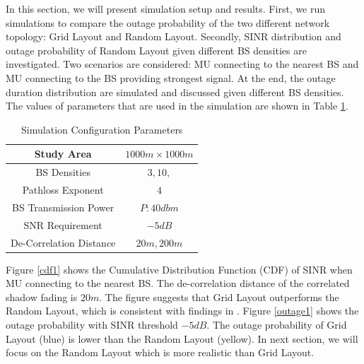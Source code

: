 \documentclass[journal,comsoc]{IEEEtran}
\begin{document}
In this section, we will present simulation setup and results. First, we run simulations to compare the outage probability of the two different network topology: Grid Layout and Random Layout. Secondly, SINR distribution and outage probability of Random Layout given different BS densities are investigated. Two scenarios are considered: MU connecting to the nearest BS and MU connecting to the BS providing strongest signal. At the end, the outage duration distribution are simulated and discussed given different BS densities. The values of parameters that are used in the simulation are shown in Table \ref{SystemConfig2}. 
\begin{table}
\centering
\caption{\label{SystemConfig2}Simulation Configuration Parameters}

\begin{tabular}{|c|c|}

\hline
Study Area & $1000m\times 1000m$\\
\hline
BS Densities & $3, 10,$\\
\hline
Pathloss Exponent & $4$\\
\hline
BS Transmission Power & $P: 40dbm$\\
\hline
SNR Requirement & $-5dB$\\
\hline
De-Correlation Distance & $20m, 200m$\\
\hline
\end{tabular}

\end{table}
\par Figure \ref{cdf1} shows the Cumulative Distribution Function (CDF) of SINR when MU connecting to the nearest BS. The de-correlation distance of the correlated shadow fading is $20m$. The figure suggests that Grid Layout outperforms the Random Layout, which is consistent with findings in \cite{andrews2011tractable}. Figure \ref{outage1} shows the outage probability with SINR threshold $-5dB$. The outage probability of Grid Layout (blue) is lower than the Random Layout (yellow). In next section, we will focus on the Random Layout which is more realistic than Grid Layout.
\end{document}
